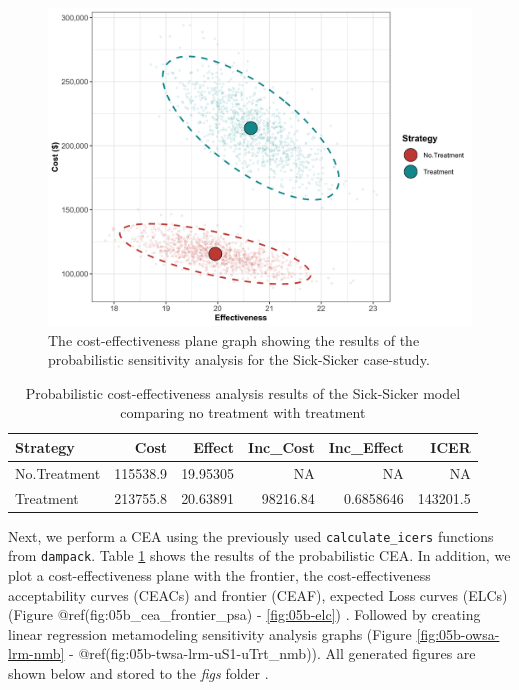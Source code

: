 \documentclass[]{book}
\begin{document}
\begin{figure}

{\centering \includegraphics[width=1\linewidth]{../figs/05b_cea_plane_scatter} 

}

\caption{The cost-effectiveness plane graph showing the results of the probabilistic sensitivity analysis for the Sick-Sicker case-study.}\label{fig:05b-CEAplane}
\end{figure}

\begin{table}[t]

\caption{\label{tab:df-cea-prob}Probabilistic cost-effectiveness analysis results of the Sick-Sicker model comparing no treatment with treatment}
\centering
\begin{tabular}{l|r|r|r|r|r}
\hline
Strategy & Cost & Effect & Inc\_Cost & Inc\_Effect & ICER\\
\hline
No.Treatment & 115538.9 & 19.95305 & NA & NA & NA\\
\hline
Treatment & 213755.8 & 20.63891 & 98216.84 & 0.6858646 & 143201.5\\
\hline
\end{tabular}
\end{table}

Next, we perform a CEA using the previously used \texttt{calculate\_icers} functions from \texttt{dampack}. Table \ref{tab:df-cea-prob} shows the results of the probabilistic CEA. In addition, we plot a cost-effectiveness plane with the frontier, the cost-effectiveness acceptability curves (CEACs) and frontier (CEAF), expected Loss curves (ELCs) (Figure @ref(fig:05b\_cea\_frontier\_psa) - \ref{fig:05b-elc}) \citep{Alarid-Escudero2019}. Followed by creating linear regression metamodeling sensitivity analysis graphs (Figure \ref{fig:05b-owsa-lrm-nmb} - @ref(fig:05b-twsa-lrm-uS1-uTrt\_nmb))\citep{Jalal2013}. All generated figures are shown below and stored to the \emph{figs} folder .
\end{document}
